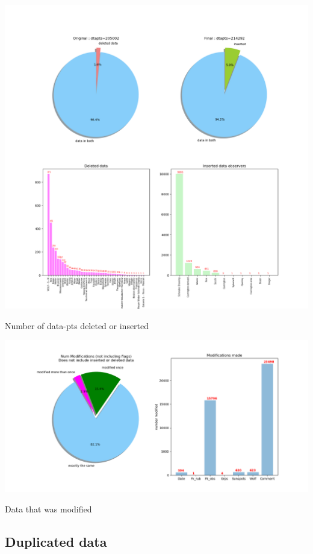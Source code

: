 \documentclass[12pt]{article}
\begin{document}
{\centering
\includegraphics[width=\linewidth]{pie-charts-1-deleted-inserted.png}
\caption{Number of data-pts deleted or inserted}
\label{fig:pie chart deleted inserted}
\par}

{\centering
\includegraphics[width=\linewidth]{pie-charts-2-modified-database.png}
\caption{Data that was modified}
\label{fig:pie chart modified data}
\par}

\subsection{Duplicated data}\label{section:duplicated data}
\end{document}
